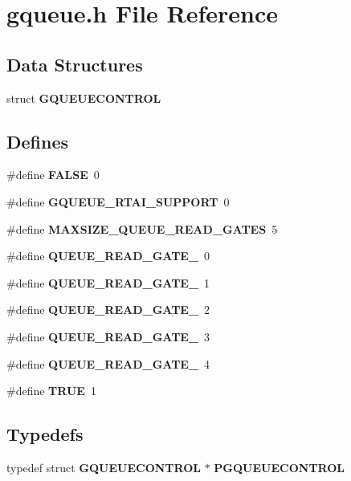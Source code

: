 \section{gqueue.h File Reference}
\label{gqueue_8h}
\subsection*{Data Structures}
\begin{DoxyCompactItemize}
\item 
struct {\bf GQUEUECONTROL}
\end{DoxyCompactItemize}
\subsection*{Defines}
\begin{DoxyCompactItemize}
\item 
\#define {\bf FALSE}~0
\item 
\#define {\bf GQUEUE\_\-RTAI\_\-SUPPORT}~0
\item 
\#define {\bf MAXSIZE\_\-QUEUE\_\-READ\_\-GATES}~5
\item 
\#define {\bf QUEUE\_\-READ\_\-GATE\_}~0
\item 
\#define {\bf QUEUE\_\-READ\_\-GATE\_}~1
\item 
\#define {\bf QUEUE\_\-READ\_\-GATE\_}~2
\item 
\#define {\bf QUEUE\_\-READ\_\-GATE\_}~3
\item 
\#define {\bf QUEUE\_\-READ\_\-GATE\_}~4
\item 
\#define {\bf TRUE}~1
\end{DoxyCompactItemize}
\subsection*{Typedefs}
\begin{DoxyCompactItemize}
\item 
typedef struct {\bf GQUEUECONTROL} $\ast$ {\bf PGQUEUECONTROL}
\end{DoxyCompactItemize}
